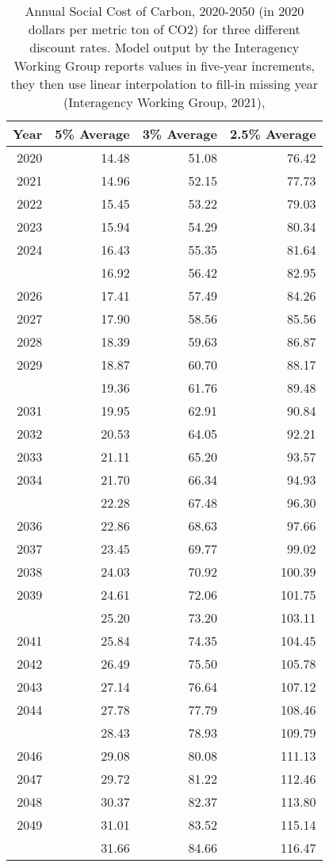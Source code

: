 \begin{table}

\caption{\label{tab:global_params}Annual Social Cost of Carbon, 2020-2050 (in 2020 dollars per metric ton of CO2) for three different discount rates. Model output by the Interagency Working Group reports values in five-year increments, they then use linear interpolation to fill-in missing year (Interagency Working Group, 2021),}
\centering
\begin{tabular}[t]{rrrr}
\toprule
Year & 5\% Average & 3\% Average & 2.5\% Average\\
\midrule
2020 & 14.48 & 51.08 & 76.42\\
2021 & 14.96 & 52.15 & 77.73\\
2022 & 15.45 & 53.22 & 79.03\\
2023 & 15.94 & 54.29 & 80.34\\
2024 & 16.43 & 55.35 & 81.64\\
\addlinespace
2025 & 16.92 & 56.42 & 82.95\\
2026 & 17.41 & 57.49 & 84.26\\
2027 & 17.90 & 58.56 & 85.56\\
2028 & 18.39 & 59.63 & 86.87\\
2029 & 18.87 & 60.70 & 88.17\\
\addlinespace
2030 & 19.36 & 61.76 & 89.48\\
2031 & 19.95 & 62.91 & 90.84\\
2032 & 20.53 & 64.05 & 92.21\\
2033 & 21.11 & 65.20 & 93.57\\
2034 & 21.70 & 66.34 & 94.93\\
\addlinespace
2035 & 22.28 & 67.48 & 96.30\\
2036 & 22.86 & 68.63 & 97.66\\
2037 & 23.45 & 69.77 & 99.02\\
2038 & 24.03 & 70.92 & 100.39\\
2039 & 24.61 & 72.06 & 101.75\\
\addlinespace
2040 & 25.20 & 73.20 & 103.11\\
2041 & 25.84 & 74.35 & 104.45\\
2042 & 26.49 & 75.50 & 105.78\\
2043 & 27.14 & 76.64 & 107.12\\
2044 & 27.78 & 77.79 & 108.46\\
\addlinespace
2045 & 28.43 & 78.93 & 109.79\\
2046 & 29.08 & 80.08 & 111.13\\
2047 & 29.72 & 81.22 & 112.46\\
2048 & 30.37 & 82.37 & 113.80\\
2049 & 31.01 & 83.52 & 115.14\\
\addlinespace
2050 & 31.66 & 84.66 & 116.47\\
\bottomrule
\end{tabular}
\end{table}